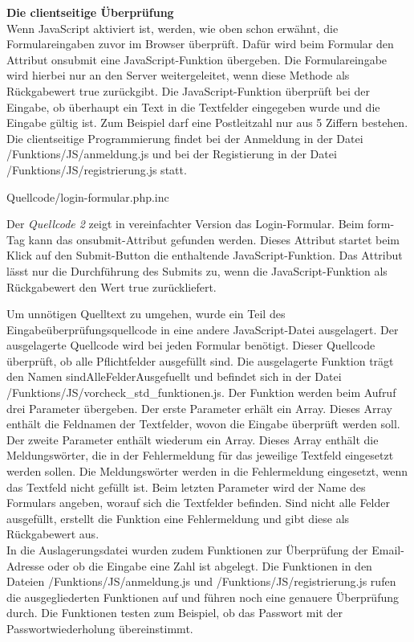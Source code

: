 \textbf{Die clientseitige Überprüfung}\\
Wenn JavaScript aktiviert ist, werden, wie oben schon erwähnt, die Formulareingaben zuvor im Browser überprüft. Dafür wird beim Formular den Attribut \glqq onsubmit\grqq{} eine JavaScript-Funktion übergeben. Die Formulareingabe wird hierbei nur an den Server weitergeleitet, wenn diese Methode als Rückgabewert \glqq true\grqq{} zurückgibt. Die JavaScript-Funktion überprüft bei der Eingabe, ob überhaupt ein Text in die Textfelder eingegeben wurde und die Eingabe gültig ist. Zum Beispiel darf eine Postleitzahl nur aus 5 Ziffern bestehen. Die clientseitige Programmierung findet bei der Anmeldung in der Datei \glqq /Funktions/JS/anmeldung.js\grqq{} und bei der Registierung in der Datei \glqq /Funktions/JS/registrierung.js\grqq{} statt.

\begin{center}
	\begin{lstinputlisting}[language=HTML, caption={Login-Formular (vereinfacht)}]
		{Quellcode/login-formular.php.inc}
	\end{lstinputlisting}
\end{center}

Der \textit{Quellcode 2} zeigt in vereinfachter Version das Login-Formular. Beim \glqq form\grqq{}-Tag kann das \glqq onsubmit\grqq{}-Attribut gefunden werden. Dieses Attribut startet beim Klick auf den Submit-Button die enthaltende JavaScript-Funktion. Das Attribut lässt nur die Durchführung des Submits zu, wenn die JavaScript-Funktion als Rückgabewert den Wert \glqq true\grqq{} zurückliefert.

Um unnötigen Quelltext zu umgehen, wurde ein Teil des Eingabeüberprüfungsquellcode in eine andere JavaScript-Datei ausgelagert. Der ausgelagerte Quellcode wird bei jeden Formular benötigt. Dieser Quellcode überprüft, ob alle Pflichtfelder ausgefüllt sind. Die ausgelagerte Funktion trägt den Namen \glqq sindAlleFelderAusgefuellt\grqq{} und befindet sich in der Datei \glqq /Funktions/JS/vorcheck\_std\_funktionen.js\grqq{}. Der Funktion werden beim Aufruf drei Parameter übergeben. Der erste Parameter erhält ein Array. Dieses Array enthält die Feldnamen der Textfelder, wovon die Eingabe überprüft werden soll. Der zweite Parameter enthält wiederum ein Array. Dieses Array enthält die Meldungswörter, die in der Fehlermeldung für das jeweilige Textfeld eingesetzt werden sollen. Die Meldungswörter werden in die Fehlermeldung eingesetzt, wenn das Textfeld nicht gefüllt ist. Beim letzten Parameter wird der Name des Formulars angeben, worauf sich die Textfelder befinden. Sind nicht alle Felder ausgefüllt, erstellt die Funktion eine Fehlermeldung und gibt diese als Rückgabewert aus.\\
In die Auslagerungsdatei wurden zudem Funktionen zur Überprüfung der Email-Adresse oder ob die Eingabe eine Zahl ist abgelegt. Die Funktionen in den Dateien \glqq /Funktions/JS/anmeldung.js\grqq{} und  
\glqq /Funktions/JS/registrierung.js\grqq{} rufen die ausgegliederten Funktionen auf und führen noch eine genauere Überprüfung durch. Die Funktionen testen zum Beispiel, ob das Passwort mit der Passwortwiederholung übereinstimmt.\\

